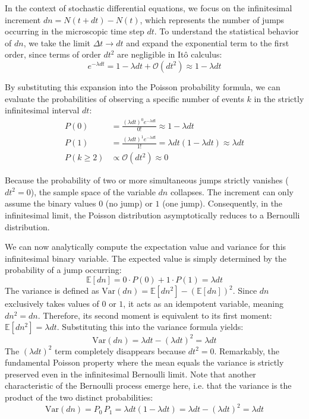 \documentclass[a4paper,12pt]{article}
\begin{document}
	In the context of stochastic differential equations, we focus on the infinitesimal increment $dn = N(t+dt) - N(t)$, which represents the number of jumps occurring in the microscopic time step $dt$. To understand the statistical behavior of $dn$, we take the limit $\Delta t \to dt$ and expand the exponential term to the first order, since terms of order $dt^2$ are negligible in It\^o calculus:
	\begin{equation}
		e^{-\lambda dt} = 1 - \lambda dt + \mathcal{O}(dt^2) \approx 1 - \lambda dt
	\end{equation}
	
	By substituting this expansion into the Poisson probability formula, we can evaluate the probabilities of observing a specific number of events $k$ in the strictly infinitesimal interval $dt$:
	\begin{align}
		P(0) &= \frac{(\lambda dt)^0 e^{-\lambda dt}}{0!} \approx 1 - \lambda dt \\
		P(1) &= \frac{(\lambda dt)^1 e^{-\lambda dt}}{1!} = \lambda dt(1 - \lambda dt) \approx \lambda dt \\
		P(k \ge 2) &\propto \mathcal{O}(dt^2) \approx 0
	\end{align}
	
	Because the probability of two or more simultaneous jumps strictly vanishes ($dt^2 = 0$), the sample space of the variable $dn$ collapses. The increment can only assume the binary values $0$ (no jump) or $1$ (one jump). Consequently, in the infinitesimal limit, the Poisson distribution asymptotically reduces to a Bernoulli distribution.
	
	We can now analytically compute the expectation value and variance for this infinitesimal binary variable. The expected value is simply determined by the probability of a jump occurring:
	\begin{equation}
		\mathbb{E}[dn] = 0 \cdot P(0) + 1 \cdot P(1) = \lambda dt
	\end{equation}
	The variance is defined as $\text{Var}(dn) = \mathbb{E}[dn^2] - (\mathbb{E}[dn])^2$. Since $dn$ exclusively takes values of $0$ or $1$, it acts as an idempotent variable, meaning $dn^2 = dn$. Therefore, its second moment is equivalent to its first moment: $\mathbb{E}[dn^2] = \lambda dt$. Substituting this into the variance formula yields:
	\begin{equation}
		\text{Var}(dn) = \lambda dt - (\lambda dt)^2 = \lambda dt
	\end{equation}
	The $(\lambda dt)^2$ term completely disappears because $dt^2 = 0$. Remarkably, the fundamental Poisson property where the mean equals the variance is strictly preserved even in the infinitesimal Bernoulli limit. Note that another characteristic of the Bernoulli process emerge here, i.e. that the variance is the product of the two distinct probabilities:
	\begin{equation}
		\text{Var}(dn) = P_{0} \, P_{1} = \lambda dt \left(1 - \lambda dt \right) = \lambda dt - (\lambda dt)^2 = \lambda dt
	\end{equation}
	
\end{document}

